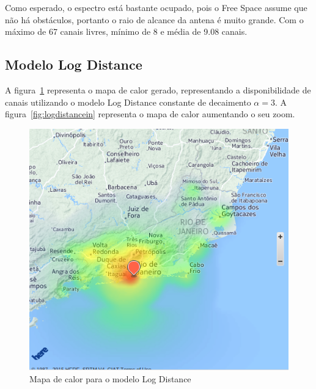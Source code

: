 \FloatBarrier

Como esperado, o espectro está bastante ocupado, pois o Free Space assume que não há obstáculos, portanto o raio de alcance da antena é muito grande. Com o máximo de 67 canais livres, mínimo de 8 e média de 9.08 canais.


\subsection{Modelo Log Distance}

A figura~\ref{fig:logdistanceout} representa o mapa de calor gerado, representando a disponibilidade de canais utilizando o modelo Log Distance constante de decaimento \begin{math}\alpha=3 \end{math}. A figura~\ref{fig:logdistancein} representa o mapa de calor aumentando o seu zoom.

\begin{figure}[htb]
\centering
\includegraphics[width=1.0\textwidth]{figs/logdistanceout}
\caption[Mapa de calor para o modelo Log Distance]
{Mapa de calor para o modelo Log Distance}
\label{fig:logdistanceout}
\end{figure} 

